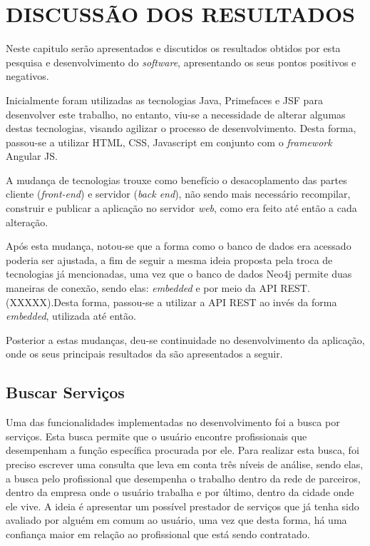 
\chapter{DISCUSSÃO DOS RESULTADOS} 

\par Neste capitulo serão apresentados e discutidos os resultados obtidos por esta pesquisa e desenvolvimento do \textit{software}, apresentando os seus pontos positivos e negativos.

\par Inicialmente foram utilizadas as tecnologias Java, Primefaces e JSF para desenvolver este trabalho, no entanto, viu-se a necessidade de alterar algumas destas tecnologias, visando agilizar o processo de desenvolvimento. Desta forma, passou-se a utilizar HTML, CSS, Javascript em conjunto com o \textit{framework} Angular JS.

\par A mudança de tecnologias trouxe como benefício o desacoplamento das partes cliente (\textit{front-end}) e servidor (\textit{back end}), não sendo mais necessário recompilar, construir e publicar a aplicação no servidor \textit{web}, como era feito até então a cada alteração.

\par Após esta mudança, notou-se que a forma como o banco de dados era acessado poderia ser ajustada, a fim de seguir a mesma ideia proposta pela troca de tecnologias já mencionadas, uma vez que o banco de dados Neo4j permite duas maneiras de conexão, sendo elas: \textit{embedded} e por meio da API REST.(XXXXX).Desta forma, passou-se a utilizar a API REST ao invés da forma \textit{embedded}, utilizada até então.

\par Posterior a estas mudanças, deu-se continuidade no desenvolvimento da aplicação, onde os seus principais resultados da são apresentados a seguir.


\section{Buscar Serviços}

\par Uma das funcionalidades implementadas no desenvolvimento foi a busca por serviços. Esta busca permite que o usuário encontre profissionais que desempenham a função específica procurada por ele. Para realizar esta busca, foi preciso escrever uma consulta que leva em conta três níveis de análise, sendo elas, a busca pelo profissional que desempenha o trabalho dentro da rede de parceiros, dentro da empresa onde o usuário trabalha e por último, dentro da cidade onde ele vive. A ideia é apresentar um possível prestador de serviços que já tenha sido avaliado por alguém em comum ao usuário, uma vez que desta forma, há uma confiança maior em relação ao profissional que está sendo contratado. 


